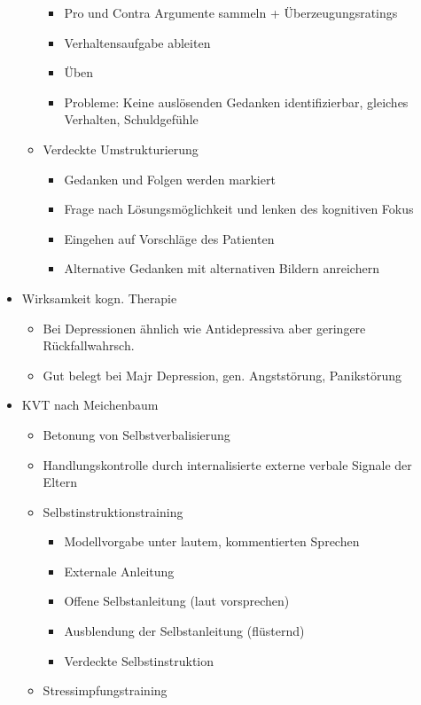 \documentclass[11pt, paper=a4, twocolumn]{scrartcl}
\begin{document}
\begin{itemize}
\begin{itemize}
\begin{itemize}
							\item Pro und Contra Argumente sammeln + Überzeugungsratings
							\item Verhaltensaufgabe ableiten
							\item Üben
							\item Probleme: Keine auslösenden Gedanken identifizierbar, gleiches Verhalten, Schuldgefühle
						\end{itemize}
					\item Verdeckte Umstrukturierung
						\begin{itemize}
							\item Gedanken und Folgen werden markiert
							\item Frage nach Lösungsmöglichkeit und lenken des kognitiven Fokus
							\item Eingehen auf Vorschläge des Patienten
							\item Alternative Gedanken mit alternativen Bildern anreichern
						\end{itemize}
				\end{itemize}
			\item Wirksamkeit kogn. Therapie
				\begin{itemize}
					\item Bei Depressionen ähnlich wie Antidepressiva aber geringere Rückfallwahrsch.
					\item Gut belegt bei Majr Depression, gen. Angststörung, Panikstörung
				\end{itemize}
			\item KVT nach Meichenbaum
				\begin{itemize}
					\item Betonung von Selbstverbalisierung
					\item Handlungskontrolle durch internalisierte externe verbale Signale der Eltern
					\item Selbstinstruktionstraining
						\begin{itemize}
							\item Modellvorgabe unter lautem, kommentierten Sprechen
							\item Externale Anleitung
							\item Offene Selbstanleitung (laut vorsprechen)
							\item Ausblendung der Selbstanleitung (flüsternd)
							\item Verdeckte Selbstinstruktion
						\end{itemize}
					\item Stressimpfungstraining

\end{itemize}
\end{itemize}
\end{document}
